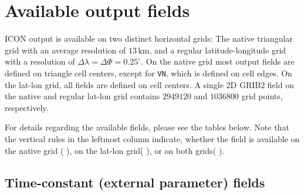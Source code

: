 \section{Available output fields}\label{sec_outfields}

ICON output is available on two distinct horizontal grids: The native triangular grid with an average resolution of $13\,\mathrm{km}$, 
and a regular latitude-longitude grid with a resolution of $\Delta \lambda = \Delta \Phi=0.25^{\circ}$. On the native grid most output 
fields are defined on triangle cell centers, except for \texttt{VN}, which is defined on cell edges. On the lat-lon grid, all fields are 
defined on cell centers. A single 2D GRIB2 field on the native and regular lat-lon grid contains $2949120$ and $1036800$ grid points, respectively. 

For details regarding the available fields, please see the tables below. Note that the vertical rules in the leftmost column indicate, whether the field is 
available on the native grid ($\,$\markRed$\,$), on the lat-lon grid($\,$\markBlue$\,$), or on both grids($\,$\markRed\markBlue$\,$). 

\subsection{Time-constant (external parameter) fields}

